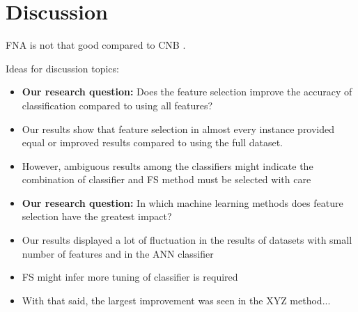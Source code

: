 \chapter{Discussion}

FNA is not that good compared to CNB \parencite{Topps2018}.

Ideas for discussion topics:
\begin{itemize}
  \item \textbf{Our research question: } Does the feature selection improve the accuracy of classification compared to using all features?
  \item Our results show that feature selection in almost every instance provided equal or improved results compared to using the full dataset.
  \item However, ambiguous results among the classifiers might indicate the combination of classifier and FS method must be selected with care
  \item \textbf{Our research question: } In which machine learning methods does feature selection have the greatest impact?
  \item Our results displayed a lot of fluctuation in the results of datasets with small number of features and in the ANN classifier
  \item FS might infer more tuning of classifier is required
  \item With that said, the largest improvement was seen in the XYZ method...  
\end{itemize}
